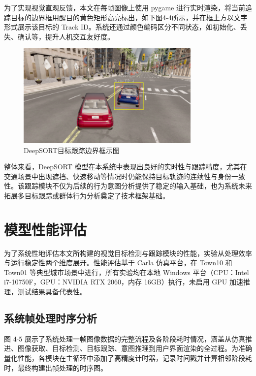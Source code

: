 为了实现视觉直观反馈，本文在每帧图像上使用 pygame 进行实时渲染，将当前追踪目标的边界框用醒目的黄色矩形高亮标出，如下图4-4所示，并在框上方以文字形式展示该目标的 Track ID。系统还通过颜色编码区分不同状态，如初始化、丢失、确认等，提升人机交互友好度。

\begin{figure}[H]
    \centering
    \includegraphics[width=0.8\textwidth]{images/图10 DeepSORT目标跟踪边界框示图.pdf}  %
    \caption{DeepSORT目标跟踪边界框示图}
    \label{fig:example_image}  %
\end{figure}

整体来看，DeepSORT 模型在本系统中表现出良好的实时性与跟踪精度，尤其在交通场景中出现遮挡、快速移动等情况时仍能保持目标轨迹的连续性与身份一致性。该跟踪模块不仅为后续的行为意图分析提供了稳定的输入基础，也为系统未来拓展多目标跟踪或群体行为分析奠定了技术框架基础。

\section{模型性能评估}

为了系统性地评估本文所构建的视觉目标检测与跟踪模块的性能，实验从处理效率与运行稳定性两个维度展开。性能评估基于 Carla 仿真平台，在 Town10 和 Town01 等典型城市场景中进行，所有实验均在本地 Windows 平台（CPU：Intel i7-10750F，GPU：NVIDIA RTX 2060，内存 16GB）执行，未启用 GPU 加速推理，测试结果具备代表性。

\subsection{系统帧处理时序分析}

图 4-5 展示了系统处理一帧图像数据的完整流程及各阶段耗时情况，涵盖从仿真推进、图像获取、目标检测、目标跟踪、意图推理到用户界面渲染的全过程。为准确量化性能，各模块在主循环中添加了高精度计时器，记录时间戳并计算相邻阶段耗时，最终构建出帧处理的时序图。

